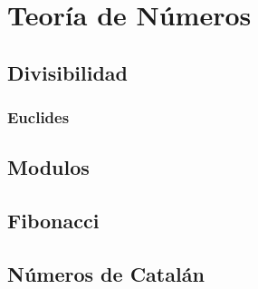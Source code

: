 \documentclass[12pt, fleqn]{report}                             %
\theoremstyle{break}                                            %
\begin{document}
    
    \clearpage
    \chapter{Teoría de Números}

        \section{Divisibilidad}

            \subsection{Euclides}

        \section{Modulos}

        \section{Fibonacci}

        \section{Números de Catalán}
\end{document}

